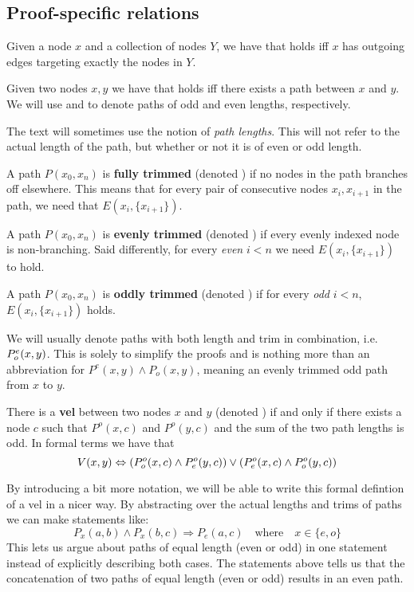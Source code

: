 \subsection{Proof-specific relations}
\label{sub:Proof-specific relations}
\begin{definition}
  Given a node $x$ and a collection of nodes $Y$, we have that  holds iff $x$ has outgoing edges targeting exactly the nodes in $Y$.
\end{definition}
\begin{definition}
  Given two nodes $x,y$ we have that  holds iff there exists a path between $x$ and $y$.
  We will use  and  to denote paths of odd and even lengths, respectively.
\end{definition}
The text will sometimes use the notion of \textit{path lengths}.  This will not refer to the actual length of the path, but whether or not it is of even or odd length.
\begin{definition}
  A path $P(x_0,x_n)$ is \textbf{fully trimmed} (denoted ) if no nodes in the path branches off elsewhere.
  This means that for every pair of consecutive nodes $x_i,x_{i+1}$ in the path, we need that $E(x_i,\{ x_{i+1} \})$.
\end{definition}
\begin{definition}
  A path $P(x_0,x_n)$ is \textbf{evenly trimmed} (denoted ) if every evenly indexed node is non-branching.
  Said differently, for every \textit{even} $i < n$ we need $E(x_i,\{x_{i+1}\})$ to hold.
\end{definition}
\begin{definition}
  A path $P(x_0,x_n)$ is \textbf{oddly trimmed} (denoted ) if for every \textit{odd} $i < n$, $E(x_i,\{x_{i+1}\})$ holds.
\end{definition}
We will usually denote paths with both length and trim in combination, i.e. $P^e_o(x,y)$.
This is solely to simplify the proofs and is nothing more than an abbreviation for $P^e(x,y) \wedge P_o(x,y)$, meaning an evenly trimmed odd path from $x$ to $y$.
\begin{definition}
  There is a \textbf{vel} between two nodes $x$ and $y$ (denoted ) if and only if there exists a node $c$ such that $P^o(x,c)$ and $P^o(y,c)$ and the sum of the two path lengths is odd. In formal terms we have that
  \[
  V(x,y) \Leftrightarrow (P^o_o(x,c) \wedge P^o_e(y,c)) \vee (P^o_e(x,c) \wedge P^o_o(y,c))
  \]
\end{definition}
By introducing a bit more notation, we will be able to write this formal defintion of a vel in a nicer way.
By abstracting over the actual lengths and trims of paths we can make statements like:
\[P_x(a,b) \wedge P_x(b,c) \Rightarrow P_e(a,c) \quad\text{where}\quad x \in \{e,o\}\]
This lets us argue about paths of equal length (even or odd) in one statement instead of explicitly describing both cases.
The statements above tells us that the concatenation of two paths of equal length (even or odd) results in an even path.

